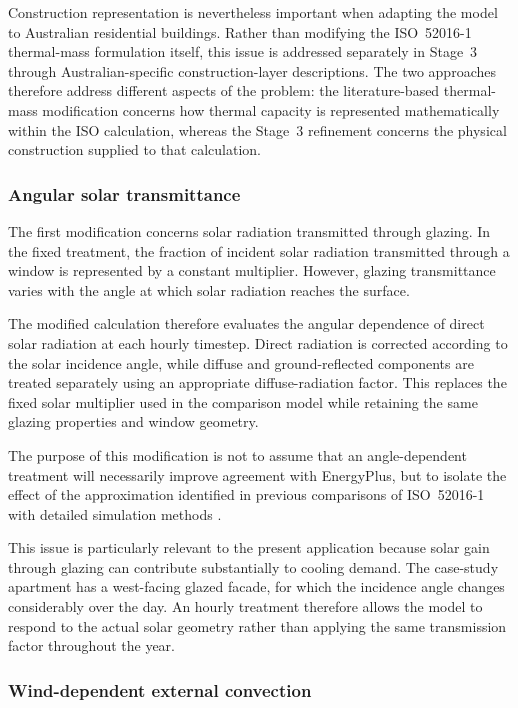 \documentclass[12pt, a4paper]{article}
\begin{document}
Construction representation is nevertheless important when adapting the model
to Australian residential buildings. Rather than modifying the
ISO~52016-1 thermal-mass formulation itself, this issue is addressed separately
in Stage~3 through Australian-specific construction-layer descriptions. The two
approaches therefore address different aspects of the problem: the
literature-based thermal-mass modification concerns how thermal capacity is
represented mathematically within the ISO calculation, whereas the Stage~3
refinement concerns the physical construction supplied to that calculation.

\subsubsection{Angular solar transmittance}

The first modification concerns solar radiation transmitted through glazing.
In the fixed treatment, the fraction of incident solar radiation transmitted
through a window is represented by a constant multiplier. However, glazing
transmittance varies with the angle at which solar radiation reaches the
surface.

The modified calculation therefore evaluates the angular dependence of direct
solar radiation at each hourly timestep. Direct radiation is corrected according
to the solar incidence angle, while diffuse and ground-reflected components are
treated separately using an appropriate diffuse-radiation factor. This replaces
the fixed solar multiplier used in the comparison model while retaining the
same glazing properties and window geometry.

The purpose of this modification is not to assume that an angle-dependent
treatment will necessarily improve agreement with EnergyPlus, but to isolate
the effect of the approximation identified in previous comparisons of
ISO~52016-1 with detailed simulation methods
\cite{zakula2021,deluca2022}.

This issue is particularly relevant to the present application because solar
gain through glazing can contribute substantially to cooling demand. The
case-study apartment has a west-facing glazed facade, for which the incidence
angle changes considerably over the day. An hourly treatment therefore allows
the model to respond to the actual solar geometry rather than applying the same
transmission factor throughout the year.

\subsubsection{Wind-dependent external convection}
\end{document}
